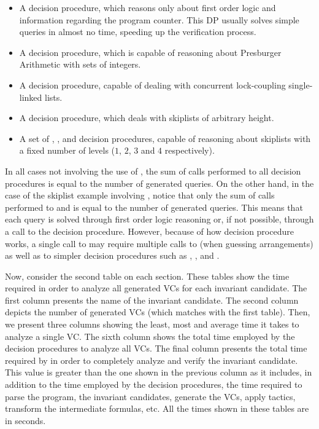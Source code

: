 \documentclass[10pt]{article}
\begin{document}
\begin{itemize}
\item A \FODP decision procedure, which reasons only about first order logic and 
information regarding the program counter. This DP usually solves simple queries 
in almost no time, speeding up the verification process.
\item A \NumDP decision procedure, which is capable of reasoning about 
Presburger Arithmetic with sets of integers.
\item A \TLLDP decision procedure, capable of dealing with concurrent 
lock-coupling single-linked lists.
\item A \TSLDP decision procedure, which deals with skiplists of arbitrary 
height.
\item A set of \TSLKOneDP, \TSLKTwoDP, \TSLKThreeDP and \TSLKFourDP decision 
procedures, capable of reasoning about skiplists with a fixed number of levels 
($1$, $2$, $3$ and $4$ respectively).
\end{itemize}

In all cases not involving the use of \TSLDP, the sum of calls performed to all 
decision procedures is equal to the number of generated queries. On the other 
hand, in the case of the skiplist example involving \TSLDP, notice that only the 
sum of calls performed to \FODP and \TSLDP is equal to the number of generated 
queries. This means that each query is solved through first order logic 
reasoning or, if not possible, through a call to the \TSLDP decision procedure.  
However, because of how \TSLDP decision procedure works, a single call to \TSLDP 
may require multiple calls to \NumDP (when guessing arrangements) as well as to 
simpler decision procedures such as \TSLKOneDP, \TSLKTwoDP, \TSLKThreeDP and 
\TSLKFourDP.

Now, consider the second table on each section. These tables show the time 
required in order to analyze all generated VCs for each invariant candidate.  
The first column presents the name of the invariant candidate. The second column 
depicts the number of generated VCs (which matches with the first table). Then, 
we present three columns showing the least, most and average time it takes to 
analyze a single VC. The sixth column shows the total time employed by the 
decision procedures to analyze all VCs. The final column presents the total time 
required by \Leap in order to completely analyze and verify the invariant 
candidate. This value is greater than the one shown in the previous column as it 
includes, in addition to the time employed by the decision procedures, the time 
required to parse the program, the invariant candidates, generate the VCs, apply 
tactics, transform the intermediate formulas, etc. All the times shown in these 
tables are in seconds.
\end{document}
